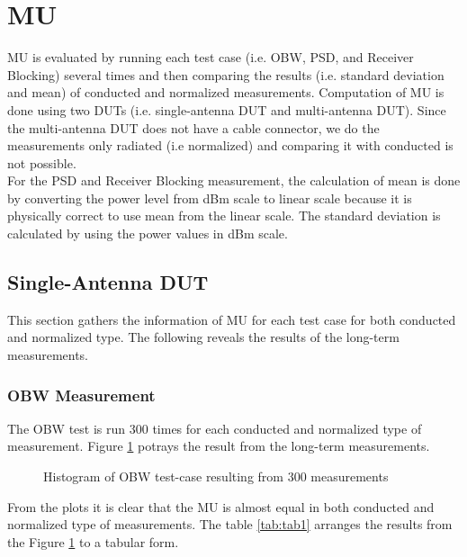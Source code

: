 \section{\acf{MU}}
\acf{MU} is evaluated by running each test case (i.e. \acf{OBW}, \acf{PSD}, and Receiver Blocking) several times and then comparing the results (i.e. standard deviation and mean) of conducted and normalized measurements. Computation of \acs{MU} is done using two \acsp{DUT} (i.e. single-antenna \acs{DUT} and multi-antenna \acs{DUT}). Since the multi-antenna \acs{DUT} does not have a cable connector, we do the measurements only radiated (i.e normalized) and comparing it with conducted is not possible. \\

For the \acs{PSD} and Receiver Blocking measurement, the calculation of mean is done by converting the power level from dBm scale to linear scale because it is physically correct to use mean from the linear scale. The standard deviation is calculated by using the power values in dBm scale. 

\subsection{Single-Antenna \acs{DUT}}
This section gathers the information of \acf{MU} for each test case for both conducted and normalized type. The following reveals the results of the long-term measurements.

\subsubsection{\acf{OBW} Measurement}
The \acs{OBW} test is run 300 times for each conducted and normalized type of measurement. Figure \ref{fig:otavscond} potrays the result from the long-term measurements.

\begin{figure}[H]
\centering
{} 
\caption{Histogram of \acs{OBW} test-case resulting from 300 measurements }
\label{fig:otavscond} 
\end{figure}

From the plots it is clear that the \acf{MU} is almost equal in both conducted and normalized type of measurements. The table \ref{tab:tab1} arranges the results from the Figure \ref{fig:otavscond} to a tabular form. 

